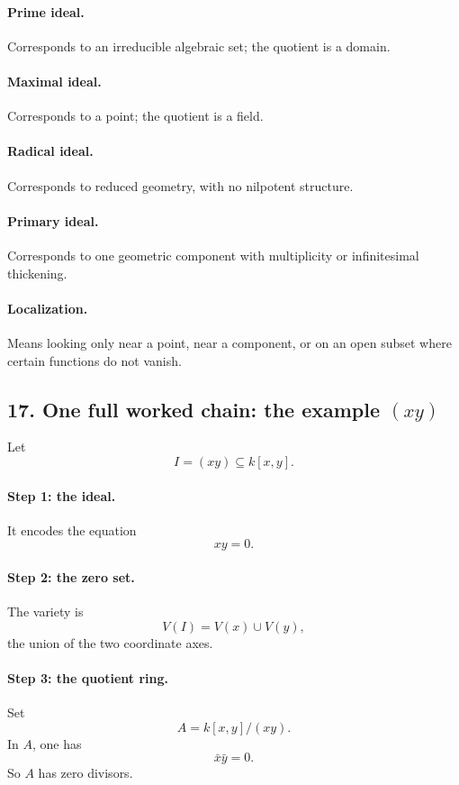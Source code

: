 \documentclass[12pt,a4paper]{article}
\theoremstyle{plain}
\theoremstyle{definition}      %
\begin{document}
	\paragraph{Prime ideal.}
	Corresponds to an irreducible algebraic set; the quotient is a domain.
	
	\paragraph{Maximal ideal.}
	Corresponds to a point; the quotient is a field.
	
	\paragraph{Radical ideal.}
	Corresponds to reduced geometry, with no nilpotent structure.
	
	\paragraph{Primary ideal.}
	Corresponds to one geometric component with multiplicity or infinitesimal thickening.
	
	\paragraph{Localization.}
	Means looking only near a point, near a component, or on an open subset where certain functions do not vanish.
	
	\subsection*{17. One full worked chain: the example \((xy)\)}
	
	Let
	\[
	I=(xy)\subseteq k[x,y].
	\]
	
	\paragraph{Step 1: the ideal.}
	It encodes the equation
	\[
	xy=0.
	\]
	
	\paragraph{Step 2: the zero set.}
	The variety is
	\[
	V(I)=V(x)\cup V(y),
	\]
	the union of the two coordinate axes.
	
	\paragraph{Step 3: the quotient ring.}
	Set
	\[
	A=k[x,y]/(xy).
	\]
	In \(A\), one has
	\[
	\bar x \bar y = 0.
	\]
	So \(A\) has zero divisors.
	
\end{document}
